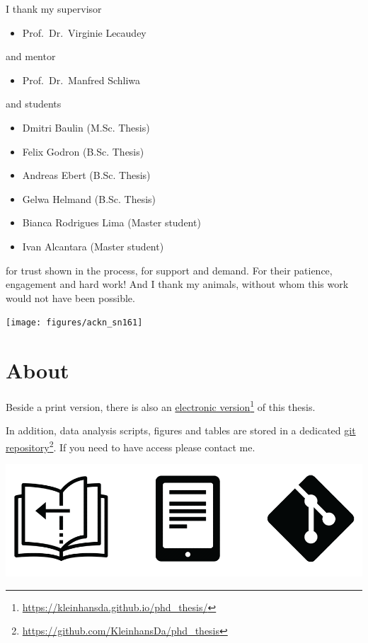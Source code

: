 \documentclass[10pt, b5paper, singlespacinge, twoside]{reedthesis} %
\providecommand{\tightlist}{%
  \setlength{\itemsep}{0pt}\setlength{\parskip}{0pt}}
\theoremstyle{definition}
\theoremstyle{definition}
\theoremstyle{definition}
\theoremstyle{remark}
\begin{document}
I thank my supervisor
\begin{itemize}
\tightlist
\item
  Prof.~Dr.~Virginie Lecaudey
\end{itemize}
\noindent and mentor
\begin{itemize}
\tightlist
\item
  Prof.~Dr.~Manfred Schliwa
\end{itemize}
\noindent and students
\begin{itemize}
\tightlist
\item
  Dmitri Baulin (M.Sc. Thesis)
\item
  Felix Godron (B.Sc. Thesis)
\item
  Andreas Ebert (B.Sc. Thesis)
\item
  Gelwa Helmand (B.Sc. Thesis)
\item
  Bianca Rodrigues Lima (Master student)
\item
  Ivan Alcantara (Master student)
\end{itemize}
for trust shown in the process, for support and demand. For their patience, engagement and hard work!
\newline
\noindent And I thank my animals, without whom this work would not have been possible.
\begin{center}\texttt{[image: figures/ackn\_sn161]} \end{center}

\newpage

\hypertarget{about}{%
\section*{About}\label{about}}

\vspace{1cm}

\noindent Beside a print version, there is also an \href{https://kleinhansda.github.io/phd_thesis/}{electronic version}\footnote{\url{https://kleinhansda.github.io/phd_thesis/}} of this thesis.

\noindent In addition, data analysis scripts, figures and tables are stored in a dedicated \href{https://github.com/KleinhansDa/phd_thesis}{git repository}\footnote{\url{https://github.com/KleinhansDa/phd_thesis}}. If you need to have access please contact me.

\includegraphics{figures/versions/versions.png}
\end{document}
